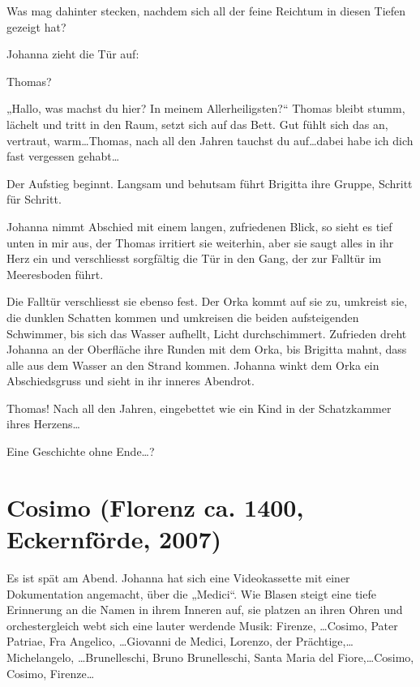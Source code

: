 \documentclass[10pt,titlepage,a5paper]{book}
\begin{document}
Was mag dahinter stecken, nachdem sich all der feine Reichtum in diesen Tiefen gezeigt hat? 

Johanna zieht die Tür auf: 

Thomas?

„Hallo, was machst du hier? In meinem Allerheiligsten?“ Thomas bleibt stumm, lächelt und tritt in den Raum, setzt sich auf das Bett. Gut fühlt sich das an, vertraut, warm\dots  Thomas, nach all den Jahren tauchst du auf\dots  dabei habe ich dich fast vergessen gehabt\dots 

Der Aufstieg beginnt. Langsam und behutsam führt Brigitta ihre Gruppe, Schritt für Schritt.

Johanna nimmt Abschied mit einem langen, zufriedenen Blick, so sieht es tief unten in mir aus, der Thomas irritiert sie weiterhin, aber sie saugt alles in ihr Herz ein und verschliesst sorgfältig die Tür in den Gang, der zur Falltür im Meeresboden führt.

Die Falltür verschliesst sie ebenso fest. Der Orka kommt auf sie zu, umkreist sie, die dunklen Schatten kommen und umkreisen die beiden aufsteigenden Schwimmer, bis sich das Wasser aufhellt, Licht durchschimmert. Zufrieden dreht Johanna an der Oberfläche ihre Runden mit dem Orka, bis Brigitta mahnt, dass alle aus dem Wasser an den Strand kommen. Johanna winkt dem Orka ein Abschiedsgruss und sieht in ihr inneres Abendrot.

Thomas! Nach all den Jahren, eingebettet wie ein Kind in der Schatzkammer ihres Herzens\dots 

Eine Geschichte ohne Ende\dots ?
   


\section*{Cosimo (Florenz ca. 1400, Eckernförde, 2007)}



Es ist spät am Abend. Johanna hat sich eine Videokassette mit einer Dokumentation angemacht, über die „Medici“. Wie Blasen steigt eine tiefe Erinnerung an die Namen in ihrem Inneren auf, sie platzen an ihren Ohren und orchestergleich webt sich eine lauter werdende Musik: Firenze, \dots Cosimo, Pater Patriae, Fra Angelico, \dots \-Giovanni de Medici, Lorenzo, der Prächtige,\dots Michelangelo, \dots  \-Brunelleschi, Bruno Brunelleschi, Santa Maria del Fiore,\dots Cosimo, Cosimo, Firenze\dots 
\end{document}

